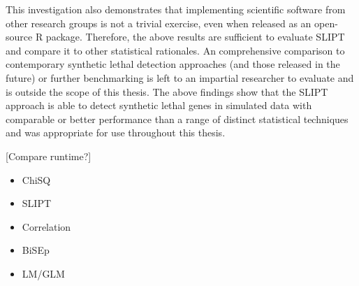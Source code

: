 This investigation also demonstrates that implementing scientific software from other research groups is not a trivial exercise, even when released as an open-source R package. Therefore, the above results are sufficient to evaluate \gls{SLIPT} and compare it to other statistical rationales. An comprehensive comparison to contemporary synthetic lethal detection approaches (and those released in the future) or further benchmarking is left to an impartial researcher to evaluate and is outside the scope of this thesis. The above findings show that the \gls{SLIPT} approach is able to detect synthetic lethal genes in simulated data with comparable or better performance than a range of distinct statistical techniques and was appropriate for use throughout this thesis.  

\iffalse

\begin{itemize}
 \item Designed for global SL
 \item Unable to detect SL partners in TCGA data
 \item Source code modified to test partners of query gene (R package)
 \item Still unable to identify SL genes for CDH1 in TCGA
 \item Computationally-intensive, longer to run than SLIPT, more difficult to evaluate many iterations
 \item Unable to identify SL candidates in a limited number of simulations
 \item Assumes Bi-modal distribution detectable: not appropriate for normalised expression data (standard in the RNA-Seq analysis) or ranked (metagenes) -- may be applicable to other datasets
 \item Comparing software is non-trivial (even those released as R packages), the above results are sufficent to evaluate \gls{SLIPT}, and further benchmarking out of scope.
\end{itemize}

\subsubsubsection{Implementation and Computation Time}
\label{chap5:compare_compute_time}
\fi

[Compare runtime?]

\iffalse
\begin{itemize}
 \item ChiSQ
 \item SLIPT
 \item Correlation
 \item BiSEp
 \item LM/GLM
\end{itemize}


